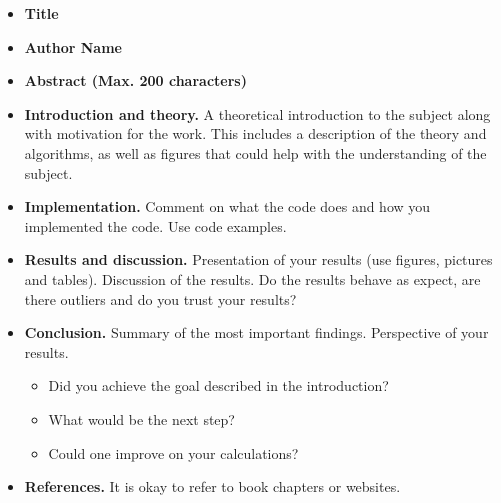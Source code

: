 \documentclass{article}
\begin{document}
\begin{itemize}

    \item {\bf Title}

    \item {\bf Author Name}


    \item {\bf Abstract (Max. 200 characters)}

    \item {\bf Introduction and theory.}
    A theoretical introduction to the subject along with motivation for the work.
    This includes a description of the theory and algorithms, as well as figures that could help with the understanding of the subject.

    \item {\bf Implementation.}
    Comment on what the code does and how you implemented the code.
    Use code examples.

    \item {\bf Results and discussion.}
    Presentation of your results (use figures, pictures and tables).
    Discussion of the results.
    Do the results behave as expect, are there outliers and 
    do you trust your results?

    \item {\bf Conclusion.}
    Summary of the most important findings.
    Perspective of your results.

    \begin{itemize}
        \item Did you achieve the goal described in the introduction?
        \item What would be the next step?
        \item Could one improve on your calculations?
    \end{itemize}

    \item {\bf References.}
    It is okay to refer to book chapters or websites.

\end{itemize}











\end{document}
